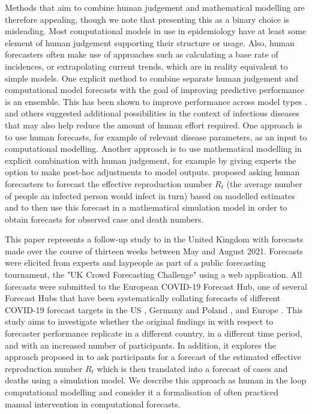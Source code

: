 \documentclass[10pt,a4paper,twocolumn]{article}
\begin{document}
Methods that aim to combine human judgement and mathematical modelling are therefore appealing, though we note that presenting this as a binary choice is misleading. Most computational models in use in epidemiology have at least some element of human judgement supporting their structure or usage. Also, human forecasters often make use of approaches such as calculating a base rate of incidences, or extrapolating current trends, which are in reality equivalent to simple models. One explicit method to combine separate human judgement and computational model forecasts with the goal of improving predictive performance is an ensemble. This has been shown to improve performance across model types \citep{mcandrewChimericForecastingCombining2022}. \citet{farrowHumanJudgmentApproach2017, bosseComparingHumanModelbased2022, swallowChallengesEstimationUncertainty2022} and others suggested additional possibilities in the context of infectious diseases that may also help reduce the amount of human effort required. One approach is to use human forecasts, for example of relevant disease parameters, as an input to computational modelling. Another approach is to use mathematical modelling in explicit combination with human judgement, for example by giving experts the option to make post-hoc adjustments to model outputs. \citet{bosseComparingHumanModelbased2022} proposed asking human forecasters to forecast the effective reproduction number $R_t$ (the average number of people an infected person would infect in turn) based on modelled estimates and to then use this forecast in a mathematical simulation model in order to obtain forecasts for observed case and death numbers. 

This paper represents a follow-up study to \citet{bosseComparingHumanModelbased2022} in the United Kingdom with forecasts made over the course of thirteen weeks between May and August 2021. Forecasts were elicited from experts and laypeople as part of a public forecasting tournament, the "UK Crowd Forecasting Challenge" using a web application. All forecasts were submitted to the European COVID-19 Forecast Hub, one of several Forecast Hubs that have been systematically collating forecasts of different COVID-19 forecast targets in the US \citep{cramerEvaluationIndividualEnsemble2021}, Germany and Poland \citep{bracherShorttermForecastingCOVID192021, bracherNationalSubnationalShortterm2022}, and Europe \citep{sherrattPredictivePerformanceMultimodel2022}. This study aims to investigate whether the original findings in \citet{bosseComparingHumanModelbased2022} with respect to forecaster performance replicate in a different country, in a different time period, and with an increased number of participants. In addition, it explores the approach proposed in \citet{bosseComparingHumanModelbased2022} to ask participants for a forecast of the estimated effective reproduction number $R_t$ which is then translated into a forecast of cases and deaths using a simulation model. We describe this approach as human in the loop computational modelling and consider it a formalisation of often practiced manual intervention in computational forecasts.
\end{document}
